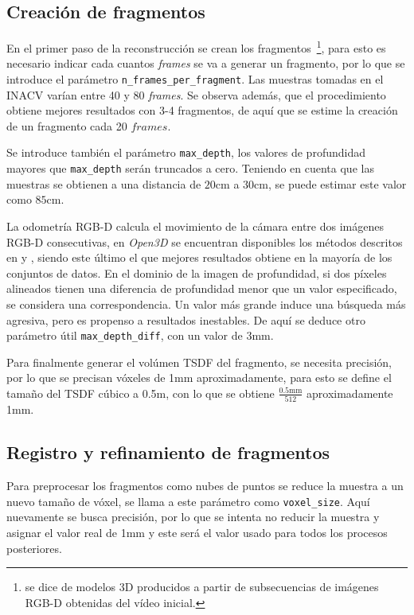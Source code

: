 \subsection{Creación de fragmentos}

En el primer paso de la reconstrucción se crean los fragmentos~\footnote{se dice de modelos 3D producidos a partir de subsecuencias de imágenes RGB-D obtenidas del vídeo inicial.}, para esto es necesario indicar cada cuantos \textit{frames} se va a generar un fragmento, por lo que se introduce el parámetro \verb|n_frames_per_fragment|. Las muestras tomadas en el INACV varían entre 40 y 80 \textit{frames}. Se observa además, que el procedimiento obtiene mejores resultados con 3-4 fragmentos, de aquí que se estime la creación de un fragmento cada 20 $frames$.

Se introduce también el parámetro \verb|max_depth|, los valores de profundidad mayores que \verb|max_depth| serán truncados a cero. Teniendo en cuenta que las muestras se obtienen a una distancia de $20\text{cm}$ a $30\text{cm}$, se puede estimar este valor como $85\text{cm}$.

La odometría RGB-D calcula el movimiento de la cámara entre dos imágenes RGB-D consecutivas, en \textit{Open3D} se encuentran disponibles los métodos descritos en \cite{steinbrucker2011real} y \cite{park2017colored}, siendo este último el que mejores resultados obtiene en la mayoría de los conjuntos de datos. En el dominio de la imagen de profundidad, si dos píxeles alineados tienen una diferencia de profundidad menor que un valor especificado, se considera una correspondencia. Un valor más grande induce una búsqueda más agresiva, pero es propenso a resultados inestables. De aquí se deduce otro parámetro útil \verb|max_depth_diff|, con un valor de $3\text{mm}$.

Para finalmente generar el volúmen TSDF del fragmento, se necesita precisión, por lo que se precisan vóxeles de 1mm aproximadamente, para esto se define el tamaño del TSDF cúbico a 0.5m, con lo que se obtiene $\frac{0.5\text{mm}}{512}$ aproximadamente 1mm.

\subsection{Registro y refinamiento de fragmentos}

Para preprocesar los fragmentos como nubes de puntos se reduce la muestra a un nuevo tamaño de vóxel, se llama a este parámetro como \verb|voxel_size|. Aquí nuevamente se busca precisión, por lo que se intenta no reducir la muestra y asignar el valor real de 1mm y este será el valor usado para todos los procesos posteriores.

